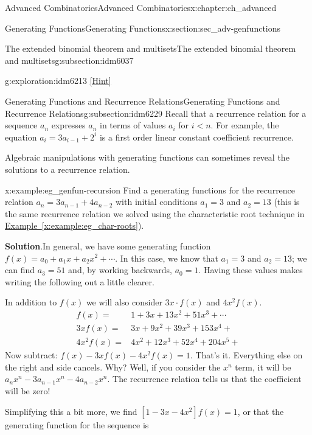 \documentclass[oneside,10pt,]{book}
\numberwithin{equation}{chapter}
\newcommand{\lt}{<}
\newcommand{\amp}{&}
\begin{document}
\begin{chapterptx}{Advanced Combinatorics}{}{Advanced Combinatorics}{}{}{x:chapter:ch_advanced}
\begin{sectionptx}{Generating Functions}{}{Generating Functions}{}{}{x:section:sec_adv-genfunctions}
\begin{subsectionptx}{The extended binomial theorem and multisets}{}{The extended binomial theorem and multisets}{}{}{g:subsection:idm6037}
\begin{exploration}{}{g:exploration:idm6213}
\space\hspace*{0pt}\hfill{\tiny\hyperlink{g:hint:idm6219-back}{[Hint]}}\end{exploration}
\end{subsectionptx}
%
%
\typeout{************************************************}
\typeout{************************************************}
%
\begin{subsectionptx}{Generating Functions and Recurrence Relations}{}{Generating Functions and Recurrence Relations}{}{}{g:subsection:idm6229}
Recall that a recurrence relation for a sequence \(a_n\) expresses \(a_n\) in terms of values \(a_i\) for \(i\lt n\). For example, the equation \(a_i=3a_{i-1} +2^i\) is a first order linear constant coefficient recurrence.%
\par
Algebraic manipulations with generating functions can sometimes reveal the solutions to a recurrence relation.%
\begin{example}{}{x:example:eg_genfun-recursion}%
Find a generating functions for the recurrence relation \(a_n = 3a_{n-1} + 4a_{n-2}\) with initial conditions \(a_1 = 3\) and \(a_2 = 13\) (this is the same recurrence relation we solved using the characteristic root technique in \hyperref[x:example:eg_char-roots]{Example~\ref{x:example:eg_char-roots}}).%
\par\smallskip%
\noindent\textbf{Solution}.\hypertarget{g:solution:idm6245}{}\quad{}In general, we have some generating function \(f(x) = a_0 + a_1x + a_2x^2 + \cdots\).  In this case, we know that \(a_1 = 3\) and \(a_2 = 13\); we can find \(a_3 = 51\) and, by working backwards, \(a_0 = 1\).  Having these values makes writing the following out a little clearer.%
\par
In addition to \(f(x)\) we will also consider \(3x\cdot f(x)\) and \(4x^2 f(x)\).%
\begin{align*}
f(x) = \amp 1 + 3x + 13x^2 + 51 x^3 + \cdots \\
3x f(x) = \amp 3x + 9x^2 + 39x^3 + 153 x^4 +  \\
4x^2 f(x) = \amp 4x^2 + 12x^3 + 52x^4 + 204 x^5 +  
\end{align*}
Now subtract: \(f(x) - 3xf(x) - 4x^2f(x) = 1\).  That's it.  Everything else on the right and side cancels.  Why?  Well, if you consider the \(x^n\) term, it will be \(a_n x^n - 3a_{n-1}x^n - 4a_{n-2}x^n\).  The recurrence relation tells us that the coefficient will be zero!%
\par
Simplifying this a bit more, we find \([1- 3x - 4x^2]f(x) = 1\), or that the generating function for the sequence is%

\end{example}
\end{subsectionptx}
\end{sectionptx}
\end{chapterptx}
\end{document}
